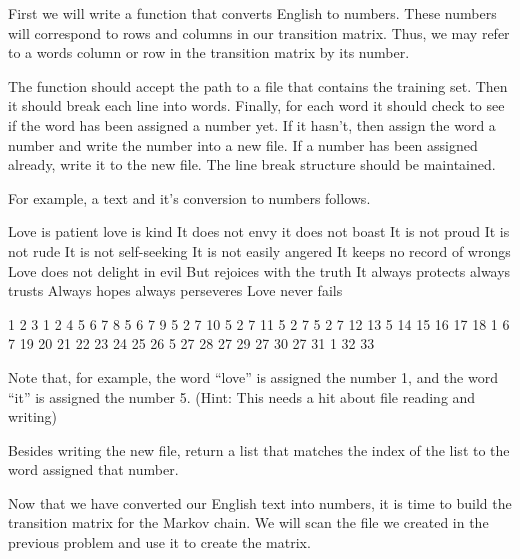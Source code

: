 \begin{problem}
First we will write a function that converts English to numbers.
These numbers will correspond to rows and columns in our transition matrix.
Thus, we may refer to a words column or row in the transition matrix by its number.

The function should accept the path to a file that contains the training set.
Then it should break each line into words.
Finally, for each word it should check to see if the word has been assigned a number yet.
If it hasn't, then assign the word a number and write the number into a new file.
If a number has been assigned already, write it to the new file.
The line break structure should be maintained.

For example, a text and it's conversion to numbers follows.

Love is patient love is kind
It does not envy it does not boast
It is not proud It is not rude
It is not self-seeking It is not easily angered
It keeps no record of wrongs
Love does not delight in evil
But rejoices with the truth
It always protects always trusts
Always hopes always perseveres
Love never fails

1 2 3 1 2 4 
5 6 7 8 5 6 7 9 
5 2 7 10 5 2 7 11 
5 2 7 5 2 7 12 13 
5 14 15 16 17 18 
1 6 7 19 20 21 
22 23 24 25 26 
5 27 28 27 29 
27 30 27 31 
1 32 33

Note that, for example, the word ``love'' is assigned the number 1, and the word ``it'' is assigned the number 5.
(Hint: This needs a hit about file reading and writing)

Besides writing the new file, return a list that matches the index of the list to the word assigned that number.
\end{problem}

Now that we have converted our English text into numbers, it is time to build the transition matrix for the Markov chain.
We will scan the file we created in the previous problem and use it to create the matrix.

